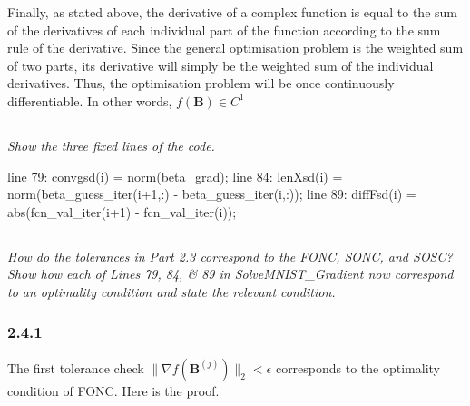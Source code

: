 \documentclass[12pt]{article}
\numberwithin{equation}{section}
\theoremstyle{remark}
\newcommand{\vect}[1]{\boldsymbol{#1}}
\newcommand{\norm}[2]{\|#1\|_{#2}}
\begin{document}
\medskip
Finally, as stated above, the derivative of a complex function is equal to the sum of the derivatives of each individual part of the function according to the sum rule of the derivative. Since the general optimisation problem is the weighted sum of two parts, its derivative will simply be the weighted sum of the individual derivatives. Thus, the optimisation problem will be once continuously differentiable. In other words, $f(\vect{B}) \in C^1$
\subsection{}
\textit{Show the three fixed lines of the code.}

\medskip
line 79: convgsd(i) = norm(beta\_grad);\newline
line 84: lenXsd(i)  = norm(beta\_guess\_iter(i+1,:) -  beta\_guess\_iter(i,:));\newline
line 89: diffFsd(i) = abs(fcn\_val\_iter(i+1) - fcn\_val\_iter(i));

\medskip
\medskip

\subsection{}
\textit{How do the tolerances in Part 2.3 correspond to the FONC, SONC, and SOSC? Show how each of Lines 79, 84, \& 89 in SolveMNIST\_Gradient now correspond to an optimality condition and state the relevant condition.}

\subsubsection{2.4.1}
The first tolerance check $\norm{\nabla f(\vect{B}^{(j)})}{2} < \epsilon$ corresponds to the optimality condition of FONC. Here is the proof.
\end{document}
